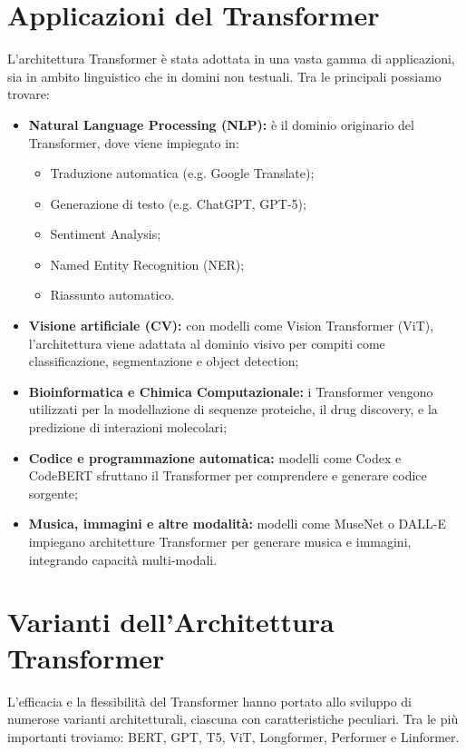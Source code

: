 \section{Applicazioni del Transformer}

L'architettura Transformer è stata adottata in una vasta gamma di applicazioni, sia in ambito linguistico che in domini non testuali. Tra le principali possiamo trovare:

\begin{itemize}
    \item \textbf{Natural Language Processing (NLP):} è il dominio originario del Transformer, dove viene impiegato in:
    \begin{itemize}
        \item Traduzione automatica (e.g. Google Translate);
        \item Generazione di testo (e.g. ChatGPT, GPT-5);
        \item Sentiment Analysis;
        \item Named Entity Recognition (NER);
        \item Riassunto automatico.
    \end{itemize}
    \item \textbf{Visione artificiale (CV):} con modelli come Vision Transformer (ViT), l'architettura viene adattata al dominio visivo per compiti come classificazione, segmentazione e object detection;
    \item \textbf{Bioinformatica e Chimica Computazionale:} i Transformer vengono utilizzati per la modellazione di sequenze proteiche, il drug discovery, e la predizione di interazioni molecolari;
    \item \textbf{Codice e programmazione automatica:} modelli come Codex e CodeBERT sfruttano il Transformer per comprendere e generare codice sorgente;
    \item \textbf{Musica, immagini e altre modalità:} modelli come MuseNet o DALL-E impiegano architetture Transformer per generare musica e immagini, integrando capacità multi-modali.
\end{itemize}

\section{Varianti dell'Architettura Transformer}

L'efficacia e la flessibilità del Transformer hanno portato allo sviluppo di numerose varianti architetturali, ciascuna con caratteristiche peculiari. Tra le più importanti troviamo: BERT, GPT, T5, ViT, Longformer, Performer e Linformer.

